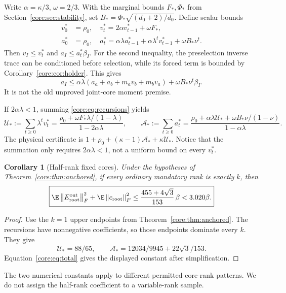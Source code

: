 \documentclass[11pt,oneside,openany,a4paper]{book}
\numberwithin{equation}{chapter}
\newtheorem{corollary}[theorem]{Corollary}
\theoremstyle{definition}
\theoremstyle{remark}
\newcommand{\F}[1]{\left\lVert#1\right\rVert_F}
\begin{document}
Write $\alpha=\kappa/3$, $\omega=2/3$. With the marginal bounds $F_*,\Phi_*$ from Section~\ref{core:sec:stability}, set $B_*=\Phi_*\sqrt{(d_0+2)/d_0}$. Define scalar bounds
\begin{equation}\label{core:eq:recursions}
 \begin{split}
 v_0^*&=\rho_0,\quad v_t^*=2\alpha v_{t-1}^*+\omega F_*,\\
 a_0^*&=\rho_0,\quad
 a_t^*=\alpha\lambda a_{t-1}^*+\alpha\lambda^t v_{t-1}^*
            +\omega B_*\nu^t.
 \end{split}
\end{equation}
Then $v_I\le v_t^*$ and $a_I\le a_t^*\beta_I$. For the second inequality, the preselection inverse trace can be conditioned before selection, while its forced term is bounded by Corollary~\ref{core:cor:holder}. This gives
\[
 a_I\le\alpha\lambda(a_a+a_b+m_av_b+m_bv_a)+\omega B_*\nu^t\beta_I.
\]
It is not the old unproved joint-core moment premise.

If $2\alpha\lambda<1$, summing \eqref{core:eq:recursions} yields
\begin{equation}\label{core:eq:sharpconstants}
 \mathcal U_*:=\sum_{t\ge0}\lambda^tv_t^*
 =\frac{\rho_0+\omega F_*\lambda/(1-\lambda)}{1-2\alpha\lambda},\qquad
 \mathcal A_*:=\sum_{t\ge0}a_t^*
 =\frac{\rho_0+\alpha\lambda\mathcal U_*+\omega B_*\nu/(1-\nu)}{1-\alpha\lambda}.
\end{equation}
The physical certificate is $1+\rho_0+(\kappa-1)\mathcal A_*+\kappa\mathcal U_*$. Notice that the summation only requires $2\alpha\lambda<1$, not a uniform bound on every $v_t^*$.

\begin{corollary}[Half-rank fixed cores]\label{core:cor:sharp}
Under the hypotheses of Theorem~\ref{core:thm:anchored}, if every ordinary mandatory rank is exactly $k$, then
\begin{equation}\label{core:eq:sharp}
 \boxed{\E\F{E_{\rm root}^{\rm out}}^2+\E\F{c_{\rm root}}^2
 \le\frac{455+4\sqrt3}{153}\,\beta<3.020\beta.}
\end{equation}
\end{corollary}
\begin{proof}
Use the $k=1$ upper endpoints from Theorem~\ref{core:thm:anchored}. The recursions have nonnegative coefficients, so those endpoints dominate every $k$. They give
\[
 \mathcal U_*=88/65,\qquad
 \mathcal A_*=12034/9945+22\sqrt3/153.
\]
Equation~\eqref{core:eq:total} gives the displayed constant after simplification.
\end{proof}
The two numerical constants apply to different permitted core-rank patterns. We do not assign the half-rank coefficient to a variable-rank sample.
\end{document}

